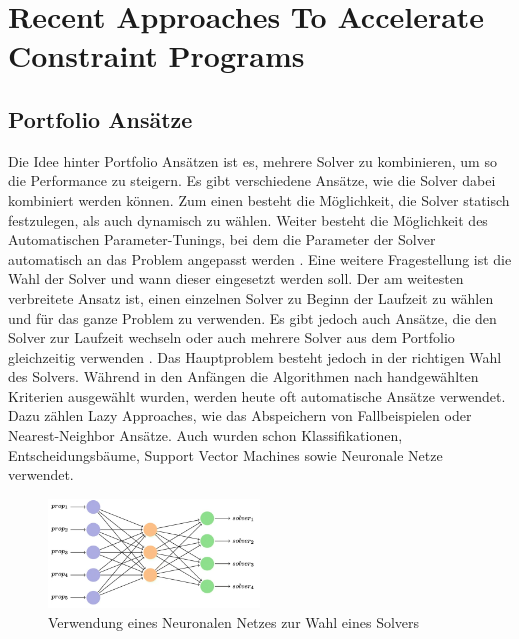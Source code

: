 \section{Recent Approaches To Accelerate Constraint Programs}
\label{sec:Recent-Approaches-To-Accelerate-Constraint-Programs}


\subsection{Portfolio Ansätze}
\label{sec:Portfolio-Ansätze}

Die Idee hinter Portfolio Ansätzen ist es, mehrere Solver zu kombinieren, um so
die Performance zu steigern. Es gibt verschiedene Ansätze, wie die Solver dabei
kombiniert werden können. Zum einen besteht die Möglichkeit, die Solver statisch
festzulegen, als auch dynamisch zu wählen. Weiter besteht die Möglichkeit des
Automatischen Parameter-Tunings, bei dem die Parameter der Solver automatisch an
das Problem angepasst werden \cite[8-11]{kotth12jo}. Eine weitere Fragestellung
ist die Wahl der Solver und wann dieser eingesetzt werden soll. Der am weitesten
verbreitete Ansatz ist, einen einzelnen Solver zu Beginn der Laufzeit zu wählen
und für das ganze Problem zu verwenden. Es gibt jedoch auch Ansätze, die den
Solver zur Laufzeit wechseln oder auch mehrere Solver aus dem Portfolio
gleichzeitig verwenden \cite[11-14]{kotth12jo}. Das Hauptproblem besteht jedoch
in der richtigen Wahl des Solvers. Während in den Anfängen die Algorithmen nach
handgewählten Kriterien ausgewählt wurden, werden heute oft automatische Ansätze
verwendet. Dazu zählen Lazy Approaches, wie das Abspeichern von Fallbeispielen
oder Nearest-Neighbor Ansätze. Auch wurden schon Klassifikationen,
Entscheidungsbäume, Support Vector Machines sowie Neuronale Netze verwendet.

\begin{figure}[h]
    \centering
    \includegraphics[width=0.5\textwidth]{figures/Neuronal Nework to choose Solver [popes22jo].PNG}
    \caption{Verwendung eines Neuronalen Netzes zur Wahl eines Solvers
    \cite[105]{popes22jo}}
    \label{fig:bild}
\end{figure}


